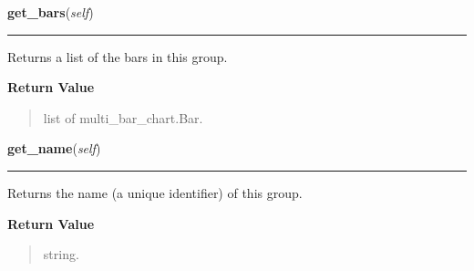     \label{pygtk_chart:multi_bar_chart:BarGroup:get_bars}

    \vspace{0.5ex}

\hspace{.8\funcindent}\begin{boxedminipage}{\funcwidth}

    \raggedright \textbf{get\_bars}(\textit{self})

    \vspace{-1.5ex}

    \rule{\textwidth}{0.5\fboxrule}
\setlength{\parskip}{2ex}
    Returns a list of the bars in this group.

\setlength{\parskip}{1ex}
      \textbf{Return Value}
    \vspace{-1ex}

      \begin{quote}
      list of multi\_bar\_chart.Bar.

      \end{quote}

    \end{boxedminipage}

    \label{pygtk_chart:multi_bar_chart:BarGroup:get_name}

    \vspace{0.5ex}

\hspace{.8\funcindent}\begin{boxedminipage}{\funcwidth}

    \raggedright \textbf{get\_name}(\textit{self})

    \vspace{-1.5ex}

    \rule{\textwidth}{0.5\fboxrule}
\setlength{\parskip}{2ex}
    Returns the name (a unique identifier) of this group.

\setlength{\parskip}{1ex}
      \textbf{Return Value}
    \vspace{-1ex}

      \begin{quote}
      string.

      \end{quote}

    \end{boxedminipage}

